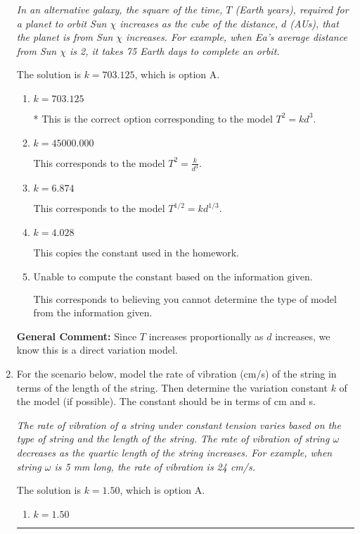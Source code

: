 \documentclass{extbook}[14pt]
\newcommand{\litem}[1]{\item #1

\rule{\textwidth}{0.4pt}}
\begin{document}
\begin{enumerate}
{\begin{center}
    \textit{ In an alternative galaxy, the square of the time, $T$ (Earth years), required for a planet to orbit Sun $\chi$ increases as the cube of the distance, $d$ (AUs), that the planet is from Sun $\chi$ increases. For example, when Ea's average distance from Sun $\chi$ is 2, it takes 75 Earth days to complete an orbit. }
\end{center}
The solution is \( k = 703.125 \), which is option A.\begin{enumerate}[label=\Alph*.]
\item \( k = 703.125 \)

* This is the correct option corresponding to the model $T^{2} = k d^{3}$.
\item \( k = 45000.000 \)

This corresponds to the model $T^{2} = \frac{k}{d^{3}}$.
\item \( k = 6.874 \)

This corresponds to the model $T^{1/2} = k d^{1/3}$.
\item \( k = 4.028 \)

This copies the constant used in the homework.
\item \( \text{Unable to compute the constant based on the information given.} \)

This corresponds to believing you cannot determine the type of model from the information given.
\end{enumerate}

\textbf{General Comment:} Since $T$ increases proportionally as $d$ increases, we know this is a direct variation model.
}
\litem{
For the scenario below, model the rate of vibration (cm/s) of the string in terms of the length of the string. Then determine the variation constant $k$ of the model (if possible). The constant should be in terms of cm and s.

\begin{center}
    \textit{ The rate of vibration of a string under constant tension varies based on the type of string and the length of the string. The rate of vibration of string $\omega$ decreases as the quartic length of the string increases. For example, when string $\omega$ is 5 mm long, the rate of vibration is 24 cm/s. }
\end{center}
The solution is \( k = 1.50 \), which is option A.\begin{enumerate}[label=\Alph*.]
\item \( k = 1.50 \)


\end{enumerate}}
\end{enumerate}
\end{document}
